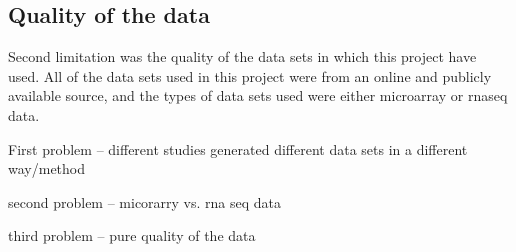 \subsection{Quality of the data}
\label{sub:quality_of_the_data}

Second limitation was the quality of the data sets in which this project have used.
All of the data sets used in this project were from an online and publicly available source, and the types of data sets used were either microarray or \gls{rnaseq} data.

First problem -- different studies generated different data sets in a different way/method

second problem -- micorarry vs. rna seq data

third problem -- pure quality of the data

















